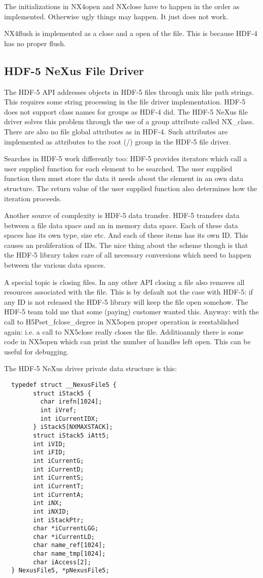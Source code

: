 \documentclass[a4paper]{article}
\begin{document}
   
The initializations in NX4open and NXclose  have to happen in the order as implemented. 
Otherwise  ugly things may happen. It just does not work.


NX4flush is implemented as a close and a open of the file. This is because HDF-4 has no proper flush.


\subsection{HDF-5 NeXus File Driver }
The HDF-5 API addresses objects in HDF-5 files through unix like path strings. This requires some string 
processing in the file driver implementation. HDF-5 does not support class names for groups as HDF-4 did. The 
HDF-5 NeXus file driver solves this problem through the use of a group attribute called NX\_class. There are 
also no file global attributes as in HDF-4. Such attributes are implemented as attributes to the root (/) 
group in the HDF-5 file driver.


Searches in HDF-5 work differently too: HDF-5 provides iterators which call a user supplied function for each 
element to be searched. The user supplied function then must store the data it needs about the element in an own 
data structure. The return value of the user supplied function also determines how the iteration proceeds. 


Another source of complexity is HDF-5 data transfer. HDF-5 transfers data between a file data space and an in memory 
data space. Each of these data spaces has its own type, size etc. And each of these items has its own ID. This 
causes an proliferation of IDs. The nice thing about the scheme though is that the HDF-5 library takes care of 
all necessary conversions which need to happen between the various data spaces. 


A special topic is closing files. In any other API closing a file also removes all resources associated with the 
file. This is by default not the case with HDF-5: if any ID is not released the HDF-5 library will keep the file
open somehow. The HDF-5 team told me that some (paying) customer wanted this. Anyway: with the call to 
H5Pset\_fclose\_degree in NX5open proper operation is reestablished again: i.e. a call to NX5close really closes the 
file. Additioannly there is some code in NX5open which can print the number of handles left open. This can be 
useful for debugging.


The HDF-5 NeXus driver private data structure is this:
\begin{verbatim}
  typedef struct __NexusFile5 {
        struct iStack5 {
          char irefn[1024];
          int iVref;
          int iCurrentIDX;
        } iStack5[NXMAXSTACK];
        struct iStack5 iAtt5;
        int iVID;
        int iFID;
        int iCurrentG;
        int iCurrentD;
        int iCurrentS;
        int iCurrentT;
        int iCurrentA;
        int iNX;
        int iNXID;
        int iStackPtr;
        char *iCurrentLGG;
        char *iCurrentLD;
        char name_ref[1024];
        char name_tmp[1024];
        char iAccess[2];
  } NexusFile5, *pNexusFile5;
\end{verbatim} 
\end{document}
